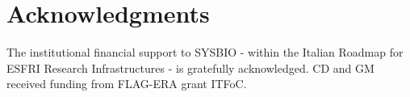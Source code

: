 \documentclass[preprint,12pt,authoryear]{elsarticle}
\begin{document}
\section*{Acknowledgments}

The institutional financial support to SYSBIO - within the Italian
Roadmap for ESFRI Research Infrastructures - is gratefully
acknowledged. CD and GM received funding from FLAG-ERA grant ITFoC.





\end{document}
